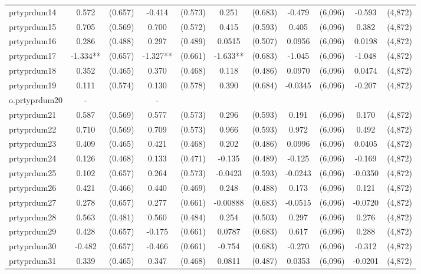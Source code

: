 \documentclass[]{article}
\begin{document}
\begin{tabular}{lcccccccccc}
prtyprdum14 & 0.572 & (0.657) & -0.414 & (0.573) & 0.251 & (0.683) & -0.479 & (6,096) & -0.593 & (4,872) \\
prtyprdum15 & 0.705 & (0.569) & 0.700 & (0.572) & 0.415 & (0.593) & 0.405 & (6,096) & 0.382 & (4,872) \\
prtyprdum16 & 0.286 & (0.488) & 0.297 & (0.489) & 0.0515 & (0.507) & 0.0956 & (6,096) & 0.0198 & (4,872) \\
prtyprdum17 & -1.334** & (0.657) & -1.327** & (0.661) & -1.633** & (0.683) & -1.045 & (6,096) & -1.048 & (4,872) \\
prtyprdum18 & 0.352 & (0.465) & 0.370 & (0.468) & 0.118 & (0.486) & 0.0970 & (6,096) & 0.0474 & (4,872) \\
prtyprdum19 & 0.111 & (0.574) & 0.130 & (0.578) & 0.390 & (0.684) & -0.0345 & (6,096) & -0.207 & (4,872) \\
o.prtyprdum20 & - &  & - &  &  &  &  &  &  &  \\
prtyprdum21 & 0.587 & (0.569) & 0.577 & (0.573) & 0.296 & (0.593) & 0.191 & (6,096) & 0.170 & (4,872) \\
prtyprdum22 & 0.710 & (0.569) & 0.709 & (0.573) & 0.966 & (0.593) & 0.972 & (6,096) & 0.492 & (4,872) \\
prtyprdum23 & 0.409 & (0.465) & 0.421 & (0.468) & 0.202 & (0.486) & 0.0996 & (6,096) & 0.0405 & (4,872) \\
prtyprdum24 & 0.126 & (0.468) & 0.133 & (0.471) & -0.135 & (0.489) & -0.125 & (6,096) & -0.169 & (4,872) \\
prtyprdum25 & 0.102 & (0.657) & 0.264 & (0.573) & -0.0423 & (0.593) & -0.0243 & (6,096) & -0.0350 & (4,872) \\
prtyprdum26 & 0.421 & (0.466) & 0.440 & (0.469) & 0.248 & (0.488) & 0.173 & (6,096) & 0.121 & (4,872) \\
prtyprdum27 & 0.278 & (0.657) & 0.277 & (0.661) & -0.00888 & (0.683) & -0.0515 & (6,096) & -0.0720 & (4,872) \\
prtyprdum28 & 0.563 & (0.481) & 0.560 & (0.484) & 0.254 & (0.503) & 0.297 & (6,096) & 0.276 & (4,872) \\
prtyprdum29 & 0.428 & (0.657) & -0.175 & (0.661) & 0.0787 & (0.683) & 0.617 & (6,096) & 0.288 & (4,872) \\
prtyprdum30 & -0.482 & (0.657) & -0.466 & (0.661) & -0.754 & (0.683) & -0.270 & (6,096) & -0.312 & (4,872) \\
prtyprdum31 & 0.339 & (0.465) & 0.347 & (0.468) & 0.0811 & (0.487) & 0.0353 & (6,096) & -0.0201 & (4,872) \\

\end{tabular}
\end{document}
